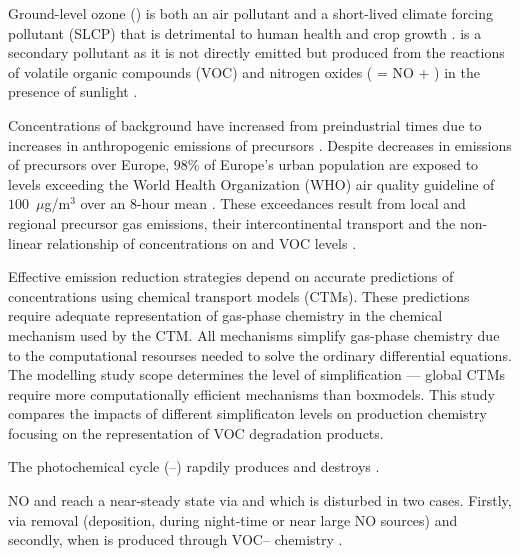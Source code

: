 Ground-level ozone () is both an air pollutant and a short-lived climate forcing pollutant (SLCP) that is detrimental to human health and crop growth \citep{AQEU:2014}. 
 is a secondary pollutant as it is not directly emitted but produced from the reactions of volatile organic compounds (VOC) and nitrogen oxides ( = NO + ) in the presence of sunlight \citep{Atkinson:2000}.

Concentrations of background  have increased from preindustrial times due to increases in anthropogenic emissions of  precursors \citep{HTAP:2010}.
Despite decreases in emissions of  precursors over Europe, $98$\% of Europe's urban population are exposed to levels exceeding the World Health Organization (WHO) air quality guideline of \mbox{$100$ $\mu$g/m$^3$} over an \mbox{$8$-hour} mean \citep{WHO:2006}. 
These exceedances result from local and regional  precursor gas emissions, their intercontinental transport and the non-linear relationship of  concentrations on  and VOC levels \citep{AQEU:2014}.

Effective emission reduction strategies depend on accurate predictions of  concentrations using chemical transport models (CTMs). 
These predictions require adequate representation of gas-phase chemistry in the chemical mechanism used by the CTM. 
All mechanisms simplify gas-phase chemistry due to the computational resourses needed to solve the ordinary differential equations.
The modelling study scope determines the level of simplification --- global CTMs require more computationally efficient mechanisms than boxmodels. 
This study compares the impacts of different simplificaton levels on  production chemistry focusing on the representation of VOC degradation products.

The photochemical cycle (--) rapdily produces and destroys . 
\begin{reactionlist}
\end{reactionlist}
NO and  reach a near-steady state via  and  which is disturbed in two cases. 
Firstly, via  removal (deposition,  during night-time or near large NO sources) and secondly, when  is produced through VOC-- chemistry \citep{Sillman:1999}.

